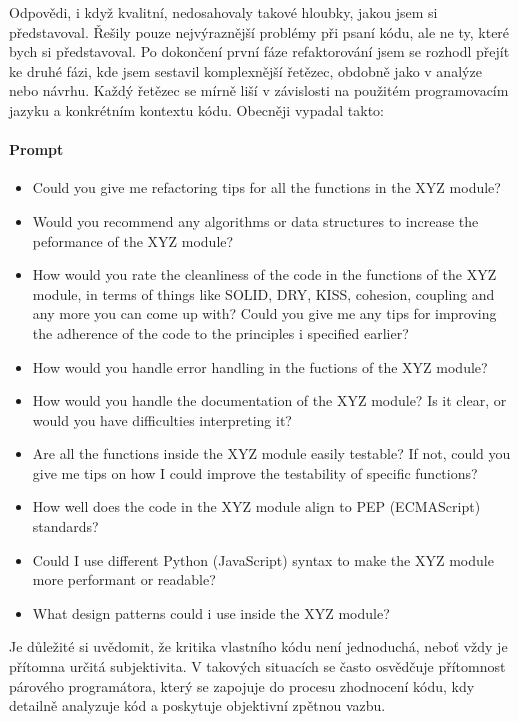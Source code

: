 \documentclass[FM,DP]{tulthesis}
\begin{document}
		Odpovědi, i když kvalitní, nedosahovaly takové hloubky, jakou jsem si představoval. Řešily pouze nejvýraznější problémy při psaní kódu, ale ne ty, které bych si představoval. Po dokončení první fáze refaktorování jsem se rozhodl přejít ke druhé fázi, kde jsem sestavil komplexnější řetězec, obdobně jako v analýze nebo návrhu. Každý řetězec se mírně liší v závislosti na použitém programovacím jazyku a konkrétním kontextu kódu. Obecněji vypadal takto:

		\vspace{0.6em}
		\begin{tcolorbox}[colback=white,colframe=black]
			\paragraph{Prompt}
			\begin{itemize}
				\item{Could you give me refactoring tips for all the functions in the XYZ module?}
				\item{Would you recommend any algorithms or data structures to increase the peformance of the XYZ module?}
				\item{How would you rate the cleanliness of the code in the functions of the XYZ module, in terms of things like SOLID, DRY, KISS, cohesion, coupling and any more you can come up with? Could you give me any tips for improving the adherence of the code to the principles i specified earlier?}
				\item{How would you handle error handling in the fuctions of the XYZ module?}
				\item{How would you handle the documentation of the XYZ module? Is it clear, or would you have difficulties interpreting it?}
				\item{Are all the functions inside the XYZ module easily testable? If not, could you give me tips on how I could improve the testability of specific functions?}
				\item{How well does the code in the XYZ module align to PEP (ECMAScript) standards?}
				\item{Could I use different Python (JavaScript) syntax to make the XYZ module more performant or readable?}
				\item{What design patterns could i use inside the XYZ module?}
			\end{itemize}
		\end{tcolorbox}
		
		Je důležité si uvědomit, že kritika vlastního kódu není jednoduchá, neboť vždy je přítomna určitá subjektivita. V takových situacích se často osvědčuje přítomnost párového programátora, který se zapojuje do procesu zhodnocení kódu, kdy detailně analyzuje kód a poskytuje objektivní zpětnou vazbu. 
		
\end{document}
